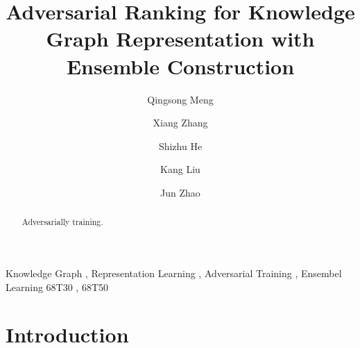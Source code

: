 \documentclass[twocolumn,a4paper,10pt,review,5p]{elsarticle}
\begin{document}

\begin{frontmatter}

\title{Adversarial Ranking for Knowledge Graph Representation with Ensemble Construction}


\author[hrbaddress]{Qingsong Meng}

\author[ucasaddress,hrbaddress]{Xiang Zhang}

\author[ucasaddress]{Shizhu He}

\author[ucasaddress]{Kang Liu}

\author[ucasaddress]{Jun Zhao}

\address[hrbaddress]{Harbin University of Science and Technology, No.52 Xuefu Road, Nangang District, Harbin, 150080, China}
\address[ucasaddress]{University of Chinese Academy of Sciences, No.19(A) Yuquan Road, Shijingshan District, Beijing, P.R.China 100049}


\begin{abstract}
Adversarially training.
\end{abstract}

\begin{keyword}
Knowledge Graph \sep{} Representation Learning \sep{} Adversarial Training \sep{} Ensembel Learning
\MSC[2010] 68T30 \sep{} 68T50
\end{keyword}

\end{frontmatter}


\linenumbers{}


\section{Introduction}
\label{sec:intro}
\end{document}
